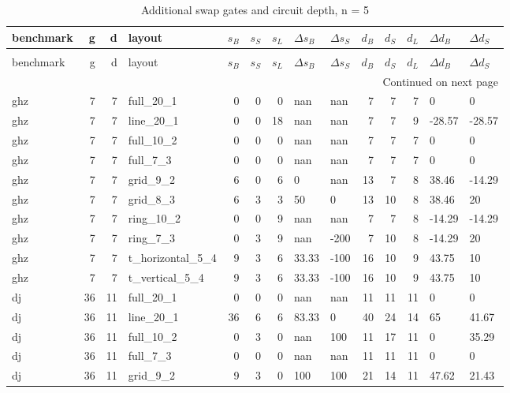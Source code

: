 \begin{longtable}{lrrlrrrllrrrll}
\caption{Additional swap gates and circuit depth, n = 5} \label{benchmark-table-5} \\
\toprule
benchmark & g & d & layout & $s_B$ & $s_S$ & $s_L$ & $\Delta s_B$ & $\Delta s_S$ & $d_B$ & $d_S$ & $d_L$ & $\Delta d_B$ & $\Delta d_S$ \\
\midrule
\endfirsthead
\caption[]{Additional swap gates and circuit depth, n = 5} \\
\toprule
benchmark & g & d & layout & $s_B$ & $s_S$ & $s_L$ & $\Delta s_B$ & $\Delta s_S$ & $d_B$ & $d_S$ & $d_L$ & $\Delta d_B$ & $\Delta d_S$ \\
\midrule
\endhead
\midrule
\multicolumn{14}{r}{Continued on next page} \\
\midrule
\endfoot
\bottomrule
\endlastfoot
ghz & 7 & 7 & full\_20\_1 & 0 & 0 & 0 & nan & nan & 7 & 7 & 7 & 0 & 0 \\
ghz & 7 & 7 & line\_20\_1 & 0 & 0 & 18 & nan & nan & 7 & 7 & 9 & -28.57 & -28.57 \\
ghz & 7 & 7 & full\_10\_2 & 0 & 0 & 0 & nan & nan & 7 & 7 & 7 & 0 & 0 \\
ghz & 7 & 7 & full\_7\_3 & 0 & 0 & 0 & nan & nan & 7 & 7 & 7 & 0 & 0 \\
ghz & 7 & 7 & grid\_9\_2 & 6 & 0 & 6 & 0 & nan & 13 & 7 & 8 & 38.46 & -14.29 \\
ghz & 7 & 7 & grid\_8\_3 & 6 & 3 & 3 & 50 & 0 & 13 & 10 & 8 & 38.46 & 20 \\
ghz & 7 & 7 & ring\_10\_2 & 0 & 0 & 9 & nan & nan & 7 & 7 & 8 & -14.29 & -14.29 \\
ghz & 7 & 7 & ring\_7\_3 & 0 & 3 & 9 & nan & -200 & 7 & 10 & 8 & -14.29 & 20 \\
ghz & 7 & 7 & t\_horizontal\_5\_4 & 9 & 3 & 6 & 33.33 & -100 & 16 & 10 & 9 & 43.75 & 10 \\
ghz & 7 & 7 & t\_vertical\_5\_4 & 9 & 3 & 6 & 33.33 & -100 & 16 & 10 & 9 & 43.75 & 10 \\
dj & 36 & 11 & full\_20\_1 & 0 & 0 & 0 & nan & nan & 11 & 11 & 11 & 0 & 0 \\
dj & 36 & 11 & line\_20\_1 & 36 & 6 & 6 & 83.33 & 0 & 40 & 24 & 14 & 65 & 41.67 \\
dj & 36 & 11 & full\_10\_2 & 0 & 3 & 0 & nan & 100 & 11 & 17 & 11 & 0 & 35.29 \\
dj & 36 & 11 & full\_7\_3 & 0 & 0 & 0 & nan & nan & 11 & 11 & 11 & 0 & 0 \\
dj & 36 & 11 & grid\_9\_2 & 9 & 3 & 0 & 100 & 100 & 21 & 14 & 11 & 47.62 & 21.43 \\

\end{longtable}
